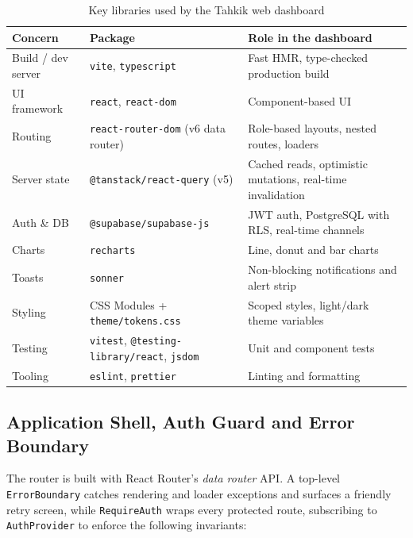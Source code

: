 \begin{table}[H]
  \centering
  \caption{Key libraries used by the Tahkik web dashboard}
  \label{tab:impl_dash_libs}
  \renewcommand{\arraystretch}{1.3}
  \begin{tabular}{lp{4.2cm}p{6cm}}
    \toprule
    \textbf{Concern} & \textbf{Package} & \textbf{Role in the dashboard} \\
    \midrule
    Build / dev server & \texttt{vite}, \texttt{typescript} & Fast HMR, type-checked production build \\
    UI framework       & \texttt{react}, \texttt{react-dom} & Component-based UI \\
    Routing            & \texttt{react-router-dom} (v6 data router) & Role-based layouts, nested routes, loaders \\
    Server state       & \texttt{@tanstack/react-query} (v5) & Cached reads, optimistic mutations, real-time invalidation \\
    Auth \& DB         & \texttt{@supabase/supabase-js} & JWT auth, PostgreSQL with RLS, real-time channels \\
    Charts             & \texttt{recharts} & Line, donut and bar charts \\
    Toasts             & \texttt{sonner} & Non-blocking notifications and alert strip \\
    Styling            & CSS Modules + \texttt{theme/tokens.css} & Scoped styles, light/dark theme variables \\
    Testing            & \texttt{vitest}, \texttt{@testing-library/react}, \texttt{jsdom} & Unit and component tests \\
    Tooling            & \texttt{eslint}, \texttt{prettier} & Linting and formatting \\
    \bottomrule
  \end{tabular}
\end{table}

\subsection{Application Shell, Auth Guard and Error Boundary}

The router is built with React Router's \emph{data router} API. A top-level \texttt{ErrorBoundary} catches rendering and loader exceptions and surfaces a friendly retry screen, while \texttt{RequireAuth} wraps every protected route, subscribing to \texttt{AuthProvider} to enforce the following invariants:


